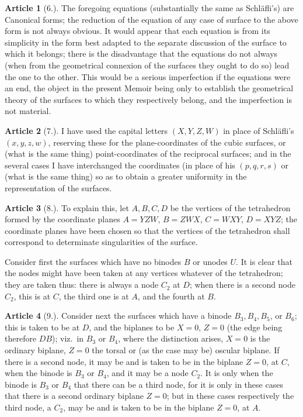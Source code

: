 \documentclass[11pt,a4paper]{article}
\theoremstyle{definition}
\newtheorem{art}{Article}
\begin{document}
\begin{art}[6.]
The foregoing equations (substantially the same as Schl\"afli's) are Canonical forms; the reduction of the equation of any case of surface to the above form is not always obvious. It would appear that each equation is from its simplicity in the form best adapted to the separate discussion of the surface to which it belongs; there is the disadvantage that the equations do not always (when from the geometrical connexion of the surfaces they ought to do so) lead the one to the other. This would be a serious imperfection if the equations were an end, the object in the present Memoir being only to establish the geometrical theory of the surfaces to which they respectively belong, and the imperfection is not material.
\end{art}

\begin{art}[7.]
I have used the capital letters $(X, Y, Z, W)$ in place of Schl\"afli's $(x, y, z, w)$, reserving these for the plane-coordinates of the cubic surfaces, or (what is the same thing) point-coordinates of the reciprocal surfaces; and in the several cases I have interchanged the coordinates (in place of his $(p, q, r, s)$ or (what is the same thing) so as to obtain a greater uniformity in the representation of the surfaces.
\end{art}

\begin{art}[8.]
To explain this, let $A, B, C, D$ be the vertices of the tetrahedron formed by the coordinate planes $A = YZW$, $B = ZWX$, $C = WXY$, $D = XYZ$; the coordinate planes have been chosen so that the vertices of the tetrahedron shall correspond to determinate singularities of the surface.

Consider first the surfaces which have no binodes $B$ or unodes $U$. It is clear that the nodes might have been taken at any vertices whatever of the tetrahedron; they are taken thus: there is always a node $C_2$ at $D$; when there is a second node $C_2$, this is at $C$, the third one is at $A$, and the fourth at $B$.
\end{art}

\begin{art}[9.]
Consider next the surfaces which have a binode $B_3, B_4, B_5$, or $B_6$; this is taken to be at $D$, and the biplanes to be $X = 0$, $Z = 0$ (the edge being therefore $DB$); viz.\ in $B_3$ or $B_4$, where the distinction arises, $X = 0$ is the ordinary biplane, $Z = 0$ the torsal or (as the case may be) oscular biplane. If there is a second node, it may be and is taken to be in the biplane $Z = 0$, at $C$, when the binode is $B_3$ or $B_4$, and it may be a node $C_2$. It is only when the binode is $B_3$ or $B_4$ that there can be a third node, for it is only in these cases that there is a second ordinary biplane $Z = 0$; but in these cases respectively the third node, a $C_2$, may be and is taken to be in the biplane $Z = 0$, at $A$.
\end{art}
\end{document}
